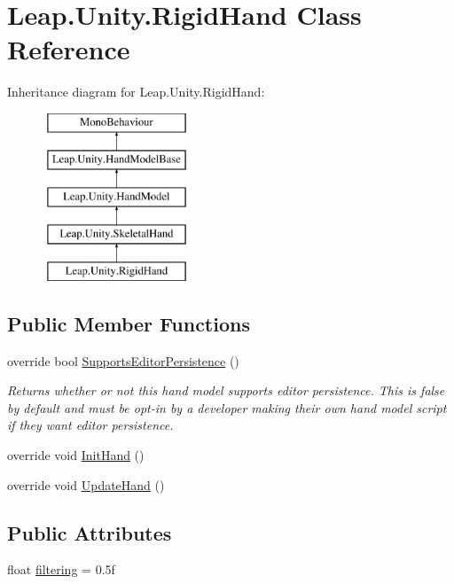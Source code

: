 \hypertarget{class_leap_1_1_unity_1_1_rigid_hand}{}\section{Leap.\+Unity.\+Rigid\+Hand Class Reference}
\label{class_leap_1_1_unity_1_1_rigid_hand}
Inheritance diagram for Leap.\+Unity.\+Rigid\+Hand\+:\begin{figure}[H]
\begin{center}
\leavevmode
\includegraphics[height=5.000000cm]{class_leap_1_1_unity_1_1_rigid_hand}
\end{center}
\end{figure}
\subsection*{Public Member Functions}
\begin{DoxyCompactItemize}
\item 
override bool \mbox{\hyperlink{class_leap_1_1_unity_1_1_rigid_hand_ae917a680f49c928d78c59a842798d7ae}{Supports\+Editor\+Persistence}} ()
\begin{DoxyCompactList}\small\item\em Returns whether or not this hand model supports editor persistence. This is false by default and must be opt-\/in by a developer making their own hand model script if they want editor persistence. \end{DoxyCompactList}\item 
override void \mbox{\hyperlink{class_leap_1_1_unity_1_1_rigid_hand_a7e76c7f3a3128c1a2e0343a43e177efa}{Init\+Hand}} ()
\item 
override void \mbox{\hyperlink{class_leap_1_1_unity_1_1_rigid_hand_a335a489bb61e5d3a95119ffdda8794b1}{Update\+Hand}} ()
\end{DoxyCompactItemize}
\subsection*{Public Attributes}
\begin{DoxyCompactItemize}
\item 
float \mbox{\hyperlink{class_leap_1_1_unity_1_1_rigid_hand_af6249c00fe304a74ce18ed16716de07b}{filtering}} = 0.\+5f
\end{DoxyCompactItemize}
